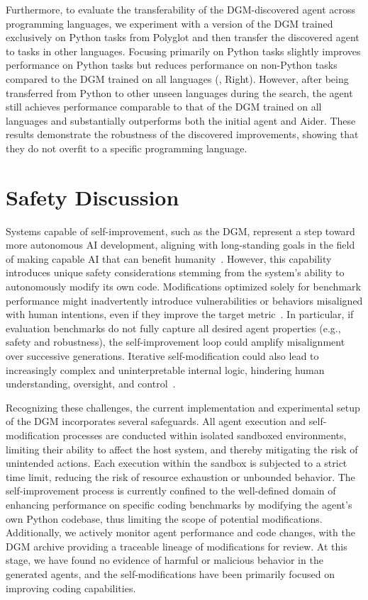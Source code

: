 \documentclass{article}
\begin{document}
Furthermore, to evaluate the transferability of the DGM-discovered agent across programming languages, we experiment with a version of the DGM trained exclusively on Python tasks from Polyglot and then transfer the discovered agent to tasks in other languages. Focusing primarily on Python tasks slightly improves performance on Python tasks but reduces performance on non-Python tasks compared to the DGM trained on all languages (, Right). However, after being transferred from Python to other unseen languages during the search, the agent still achieves performance comparable to that of the DGM trained on all languages and substantially outperforms both the initial agent and Aider. These results demonstrate the robustness of the discovered improvements, showing that they do not overfit to a specific programming language.

\section{Safety Discussion}
\label{sec:safety}

Systems capable of self-improvement, such as the DGM, represent a step toward more autonomous AI development, aligning with long-standing goals in the field of making capable AI that can benefit humanity~\citep{schmidhuber1987evolutionary, clune2019ai, markoff2016machines, lehman2023machine}. However, this capability introduces unique safety considerations stemming from the system's ability to autonomously modify its own code. Modifications optimized solely for benchmark performance might inadvertently introduce vulnerabilities or behaviors misaligned with human intentions, even if they improve the target metric~\citep{bostrom2020ethical}. In particular, if evaluation benchmarks do not fully capture all desired agent properties (e.g., safety and robustness), the self-improvement loop could amplify misalignment over successive generations. Iterative self-modification could also lead to increasingly complex and uninterpretable internal logic, hindering human understanding, oversight, and control~\citep{sheth2025safety, anwar2024foundational, greenblatt2024alignment, ganguli2022red}.

Recognizing these challenges, the current implementation and experimental setup of the DGM incorporates several safeguards. All agent execution and self-modification processes are conducted within isolated sandboxed environments, limiting their ability to affect the host system, and thereby mitigating the risk of unintended actions. Each execution within the sandbox is subjected to a strict time limit, reducing the risk of resource exhaustion or unbounded behavior. The self-improvement process is currently confined to the well-defined domain of enhancing performance on specific coding benchmarks by modifying the agent's own Python codebase, thus limiting the scope of potential modifications. Additionally, we actively monitor agent performance and code changes, with the DGM archive providing a traceable lineage of modifications for review. At this stage, we have found no evidence of harmful or malicious behavior in the generated agents, and the self-modifications have been primarily focused on improving coding capabilities.
\end{document}

